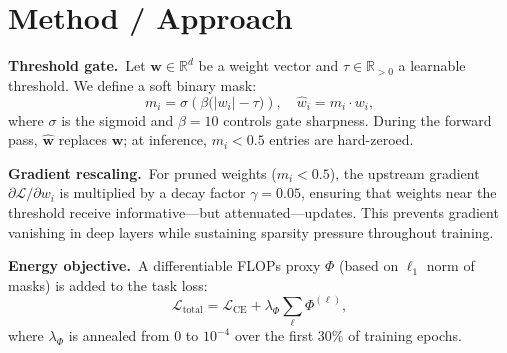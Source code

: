 \section{Method / Approach}

\textbf{Threshold gate.}\ Let $\mathbf{w} \in \mathbb{R}^d$ be a weight
vector and $\tau \in \mathbb{R}_{>0}$ a learnable threshold.  We define a
soft binary mask:
\begin{equation}
  m_i = \sigma\!\left(\beta\bigl(|w_i| - \tau\bigr)\right), \quad
  \hat{w}_i = m_i \cdot w_i,
  \label{eq:gate}
\end{equation}
where $\sigma$ is the sigmoid and $\beta{=}10$ controls gate sharpness.
During the forward pass, $\hat{\mathbf{w}}$ replaces $\mathbf{w}$; at
inference, $m_i < 0.5$ entries are hard-zeroed.

\textbf{Gradient rescaling.}\ For pruned weights ($m_i < 0.5$), the
upstream gradient $\partial\mathcal{L}/\partial w_i$ is multiplied by a
decay factor $\gamma = 0.05$, ensuring that weights near the threshold
receive informative—but attenuated—updates.  This prevents gradient
vanishing in deep layers while sustaining sparsity pressure throughout
training.

\textbf{Energy objective.}\ A differentiable FLOPs proxy $\Phi$ (based on
$\ell_1$ norm of masks) is added to the task loss:
\begin{equation}
  \mathcal{L}_{\text{total}} = \mathcal{L}_{\text{CE}}
    + \lambda_\Phi \sum_{\ell} \Phi^{(\ell)},
  \label{eq:loss}
\end{equation}
where $\lambda_\Phi$ is annealed from 0 to $10^{-4}$ over the first
30\% of training epochs.

